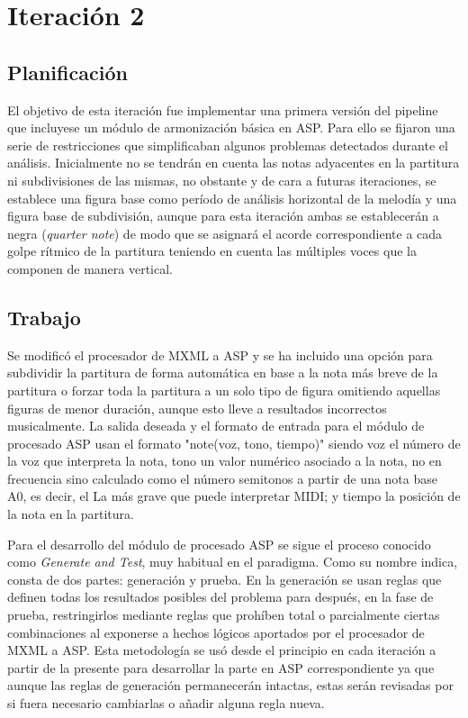 \section{Iteración 2}
\subsection{Planificación}
El objetivo de esta iteración fue implementar una primera versión del pipeline que incluyese un módulo de armonización básica en ASP. Para ello se fijaron una serie de restricciones que simplificaban algunos problemas detectados durante el análisis. Inicialmente no se tendrán en cuenta las notas adyacentes en la partitura ni subdivisiones de las mismas, no obstante y de cara a futuras iteraciones, se establece una figura base como período de análisis horizontal de la melodía y una figura base de subdivisión, aunque para esta iteración ambas se establecerán a negra (\textit{quarter note}) de modo que se asignará el acorde correspondiente a cada golpe rítmico de la partitura teniendo en cuenta las múltiples voces que la componen de manera vertical.

\subsection{Trabajo}
Se modificó el procesador de MXML a ASP y se ha incluido una opción para subdividir la partitura de forma automática en base a la nota más breve de la partitura o forzar toda la partitura a un solo tipo de figura omitiendo aquellas figuras de menor duración, aunque esto lleve a resultados incorrectos musicalmente. La salida deseada y el formato de entrada para el módulo de procesado ASP usan el formato "note(voz, tono, tiempo)" siendo voz el número de la voz que interpreta la nota, tono un valor numérico asociado a la nota, no en frecuencia sino calculado como el número semitonos a partir de una nota base A0, es decir, el La más grave que puede interpretar MIDI; y tiempo la posición de la nota en la partitura.

Para el desarrollo del módulo de procesado ASP se sigue el proceso conocido como \textit{Generate and Test}, muy habitual en el paradigma. Como su nombre indica, consta de dos partes: generación y prueba. En la generación se usan reglas que definen todas los resultados posibles del problema para después, en la fase de prueba, restringirlos mediante reglas que prohíben total o parcialmente ciertas combinaciones al exponerse a hechos lógicos aportados por el procesador de MXML a ASP. Esta metodología se usó desde el principio en cada iteración a partir de la presente para desarrollar la parte en ASP correspondiente ya que aunque las reglas de generación permanecerán intactas, estas serán revisadas por si fuera necesario cambiarlas o añadir alguna regla nueva.

